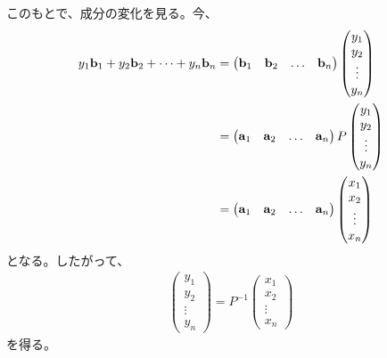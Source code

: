 \documentclass[a4paper,11pt]{jsarticle}
\numberwithin{equation}{section}
\begin{document}
このもとで、成分の変化を見る。今、
\begin{align}
  y_1\vb{b}_1 + y_2\vb{b}_2 + \dots + y_n\vb{b}_n &=
  \begin{pmatrix}
    \vb{b}_1 & \vb{b}_2 & \dots & \vb{b}_n
  \end{pmatrix}
  \begin{pmatrix}
    y_1\\
    y_2\\
    \vdots\\
    y_n
  \end{pmatrix}\\
  &=
  \begin{pmatrix}
    \vb{a}_1 & \vb{a}_2 & \dots & \vb{a}_n
  \end{pmatrix}
  P
  \begin{pmatrix}
    y_1\\
    y_2\\
    \vdots\\
    y_n
  \end{pmatrix}\\
  &=
  \begin{pmatrix}
    \vb{a}_1 & \vb{a}_2 & \dots & \vb{a}_n
  \end{pmatrix}
  \begin{pmatrix}
    x_1\\
    x_2\\
    \vdots\\
    x_n
  \end{pmatrix}
\end{align}
となる。したがって、
\begin{align}
  \begin{pmatrix}
    y_1\\
    y_2\\
    \vdots\\
    y_n
  \end{pmatrix}
  = P^{-1}
  \begin{pmatrix}
    x_1\\
    x_2\\
    \vdots\\
    x_n
  \end{pmatrix}
\end{align}
を得る。
\end{document}
